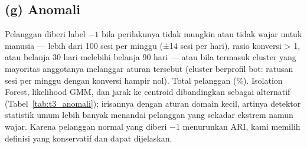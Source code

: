 \subsection*{(g) Anomali}
Pelanggan diberi label $-1$ bila perilakunya tidak mungkin atau tidak wajar untuk manusia --- lebih dari 100 sesi per minggu (±14 sesi per hari),
rasio konversi > 1, atau belanja 30 hari melebihi belanja 90 hari --- atau bila termasuk cluster yang mayoritas anggotanya melanggar aturan tersebut
(cluster berprofil bot: ratusan sesi per minggu dengan konversi hampir nol). Total \TtigaAnomaliN{} pelanggan (\TtigaAnomaliPersen\%).
Isolation Forest, likelihood GMM, dan jarak ke centroid dibandingkan sebagai alternatif (Tabel~\ref{tab:t3_anomali}); irisannya dengan aturan domain kecil,
artinya detektor statistik umum lebih banyak menandai pelanggan yang sekadar ekstrem namun wajar. Karena pelanggan normal yang diberi $-1$
menurunkan ARI, kami memilih definisi yang konservatif dan dapat dijelaskan.


